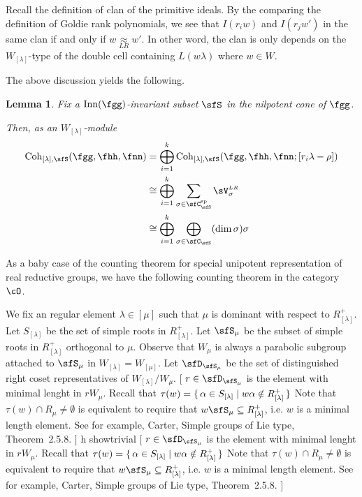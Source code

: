 \documentclass[12pt,a4paper]{amsart}
\newcommand{\trivial}[2][]{\if\relax\detokenize{#1}\relax
  {%
      \color{orange} \vspace{0em} $[$  #2 $]$
      \color{black}
  }
  \else
\ifx#1h
\ifcsname showtrivial\endcsname
{%
    \color{orange} \vspace{0em}  $[$ #2 $]$
    \color{black}
}
\fi
\else {\red Wrong argument!} \fi
\fi
}
\numberwithin{equation}{section}
\newtheorem{lem}[thm]{Lemma}
\theoremstyle{remark}
\def\Gad{\Inn(\fgg)}
\def\VLR{{\sV}^{\scriptscriptstyle LR}}
\def\Coh{\mathrm{Coh}}
\def\Csp{\sfC^{\text{sp}}}
\def\approxLR{\mathrel{\mathop{\approx}\limits_{\scriptscriptstyle LR}}}
\def\Inn{\mathrm{Inn}}
\begin{document}
Recall the definition of clan of the primitive ideals. By the comparing the
definition of Goldie rank polynomials, we see that $I(r_{i}w)$ and $I(r_{j}w')$
in the same clan if and only if $w\approxLR w'$. In other word, the clan is only
depends on the $W_{[\lambda]}$-type of the double cell containing $L(w\lambda)$
where $w\in W$.

\medskip


The above discussion yields
the following.
\begin{lem}\label{lem:C.S}
  Fix a $\Gad$-invariant subset $\sfS$ in the nilpotent cone of $\fgg$.

  Then, as an $W_{[\lambda]}$-module
  \[
    \begin{split}
      \Coh_{[\lambda],\sfS}(\fgg,\fhh,\fnn) &= \bigoplus_{i=1}^{k}
      \Coh_{[\lambda], \sfS}(\fgg,\fhh,\fnn;[r_{i}\lambda-\rho])\\
      & \cong \bigoplus_{i=1}^{k} \sum_{\sigma\in \Csp_{\sfS}} \VLR_{\sigma}\\
      & \cong \bigoplus_{i=1}^{k} \bigoplus_{\sigma\in \sfC_{\sfS}} (\dim \sigma) \sigma
    \end{split}
  \]
\end{lem}

As a baby case of the counting theorem for special unipotent representation of
real reductive groups, we have the following counting theorem in the category
$\cO$.

We fix an regular element $\lambda\in [\mu]$ such that $\mu$ is dominant with
respect to $R^{+}_{[\lambda]}$. Let $S_{[\lambda]}$ be the set of simple roots
in $R^{+}_{[\lambda]}$. Let $\sfS_{\mu}$ be the subset of simple roots in
$R^{+}_{[\lambda]}$ orthogonal to $\mu$. Observe that $W_{\mu}$ is always a
parabolic subgroup attached to $\sfS_{\mu}$ in $W_{[\lambda]} = W_{[\mu]}$. Let
$\sfD_{\sfS_{\mu}}$ be the set of distinguished right coset representatives of
$W_{[\lambda]}/W_{\mu}$. \trivial[]{ $r\in \sfD_{\sfS_{\mu}}$ is the element
  with minimal lenght in $rW_{\mu}$. Recall that
  $\tau(w) = \set{\alpha\in S_{[\lambda]}|w\alpha\notin R^{+}_{[\lambda]} }$
  Note that $\tau(w)\cap R_{\mu}\neq \emptyset$ is equivalent to require that
  $w \sfS_{\mu}\subseteq R^{+}_{[\lambda]}$, i.e. $w$ is a minimal length
  element. See for example, Carter, Simple groups of Lie type, Theorem~2.5.8. }
\end{document}
